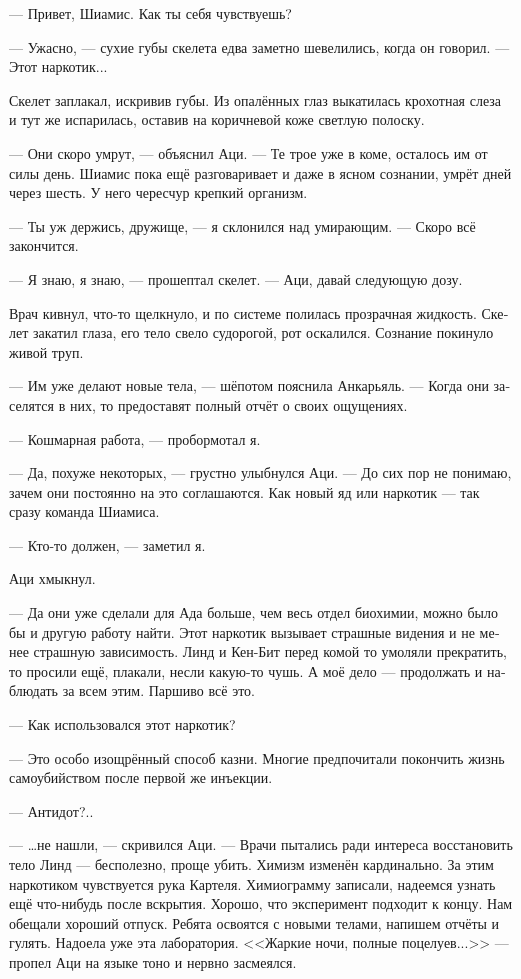 \documentclass[a4paper,12pt,fleqn]{book}\usepackage{cooltooltips}\usepackage{polyglossia}\setdefaultlanguage[babelshorthands=true]{russian}\setotherlanguage{english}\defaultfontfeatures{Ligatures=TeX,Mapping=tex-text} \usepackage{xcolor}\definecolor{lightgray}{HTML}{bbbbbb}\color{lightgray}\newcommand{\ml}[3]{\textenglish{\textcolor{black}{#3}}}
\begin{document}
{--- Привет, Шиамис.
Как ты себя чувствуешь?

--- Ужасно, --- сухие губы скелета едва заметно шевелились, когда он говорил.
--- Этот наркотик...

Скелет заплакал, искривив губы.
Из опалённых глаз выкатилась крохотная слеза и тут же испарилась, оставив на коричневой коже светлую полоску.

--- Они скоро умрут, --- объяснил Аци.
--- Те трое уже в коме, осталось им от силы день.
Шиамис пока ещё разговаривает и даже в ясном сознании, умрёт дней через шесть.
У него чересчур крепкий организм.

--- Ты уж держись, дружище, --- я склонился над умирающим.
--- Скоро всё закончится.

--- Я знаю, я знаю, --- прошептал скелет.
--- Аци, давай следующую дозу.

Врач кивнул, что-то щелкнуло, и по системе полилась прозрачная жидкость.
Скелет закатил глаза, его тело свело судорогой, рот оскалился.
Сознание покинуло живой труп.

--- Им уже делают новые тела, --- шёпотом пояснила Анкарьяль.
--- Когда они заселятся в них, то предоставят полный отчёт о своих ощущениях.

--- Кошмарная работа, --- пробормотал я.

--- Да, похуже некоторых, --- грустно улыбнулся Аци.
--- До сих пор не понимаю, зачем они постоянно на это соглашаются.
Как новый яд или наркотик --- так сразу команда Шиамиса.

--- Кто-то должен, --- заметил я.

Аци хмыкнул.

--- Да они уже сделали для Ада больше, чем весь отдел биохимии, можно было бы и другую работу найти.
Этот наркотик вызывает страшные видения и не менее страшную зависимость.
Линд и Кен-Бит перед комой то умоляли прекратить, то просили ещё, плакали, несли какую-то чушь.
А моё дело --- продолжать и наблюдать за всем этим.
Паршиво всё это.

--- Как использовался этот наркотик?

--- Это особо изощрённый способ казни.
Многие предпочитали покончить жизнь самоубийством после первой же инъекции.

--- Антидот?..

--- \ldots не нашли, --- скривился Аци.
--- Врачи пытались ради интереса восстановить тело Линд --- бесполезно, проще убить.
Химизм изменён кардинально.
За этим наркотиком чувствуется рука Картеля.
Химиограмму записали, надеемся узнать ещё что-нибудь после вскрытия.
Хорошо, что эксперимент подходит к концу.
Нам обещали хороший отпуск.
Ребята освоятся с новыми телами, напишем отчёты и гулять.
Надоела уже эта лаборатория.
<<Жаркие ночи, полные поцелуев...>> --- пропел Аци на языке тоно и нервно засмеялся.

}
\end{document}
